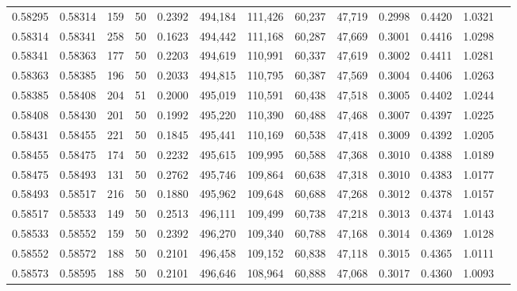 \begin{tabular}{rrrrrrrrrrrrr}
0.58295 & 0.58314 &   159 &  50 &                                     0.2392 & 494,184 & 111,426 &  60,237 &  47,719 & 0.2998 & 0.4420 & 1.0321 \\
0.58314 & 0.58341 &   258 &  50 &                                     0.1623 & 494,442 & 111,168 &  60,287 &  47,669 & 0.3001 & 0.4416 & 1.0298 \\
0.58341 & 0.58363 &   177 &  50 &                                     0.2203 & 494,619 & 110,991 &  60,337 &  47,619 & 0.3002 & 0.4411 & 1.0281 \\
0.58363 & 0.58385 &   196 &  50 &                                     0.2033 & 494,815 & 110,795 &  60,387 &  47,569 & 0.3004 & 0.4406 & 1.0263 \\
0.58385 & 0.58408 &   204 &  51 &                                     0.2000 & 495,019 & 110,591 &  60,438 &  47,518 & 0.3005 & 0.4402 & 1.0244 \\
0.58408 & 0.58430 &   201 &  50 &                                     0.1992 & 495,220 & 110,390 &  60,488 &  47,468 & 0.3007 & 0.4397 & 1.0225 \\
0.58431 & 0.58455 &   221 &  50 &                                     0.1845 & 495,441 & 110,169 &  60,538 &  47,418 & 0.3009 & 0.4392 & 1.0205 \\
0.58455 & 0.58475 &   174 &  50 &                                     0.2232 & 495,615 & 109,995 &  60,588 &  47,368 & 0.3010 & 0.4388 & 1.0189 \\
0.58475 & 0.58493 &   131 &  50 &                                     0.2762 & 495,746 & 109,864 &  60,638 &  47,318 & 0.3010 & 0.4383 & 1.0177 \\
0.58493 & 0.58517 &   216 &  50 &                                     0.1880 & 495,962 & 109,648 &  60,688 &  47,268 & 0.3012 & 0.4378 & 1.0157 \\
0.58517 & 0.58533 &   149 &  50 &                                     0.2513 & 496,111 & 109,499 &  60,738 &  47,218 & 0.3013 & 0.4374 & 1.0143 \\
0.58533 & 0.58552 &   159 &  50 &                                     0.2392 & 496,270 & 109,340 &  60,788 &  47,168 & 0.3014 & 0.4369 & 1.0128 \\
0.58552 & 0.58572 &   188 &  50 &                                     0.2101 & 496,458 & 109,152 &  60,838 &  47,118 & 0.3015 & 0.4365 & 1.0111 \\
0.58573 & 0.58595 &   188 &  50 &                                     0.2101 & 496,646 & 108,964 &  60,888 &  47,068 & 0.3017 & 0.4360 & 1.0093 \\

\end{tabular}

